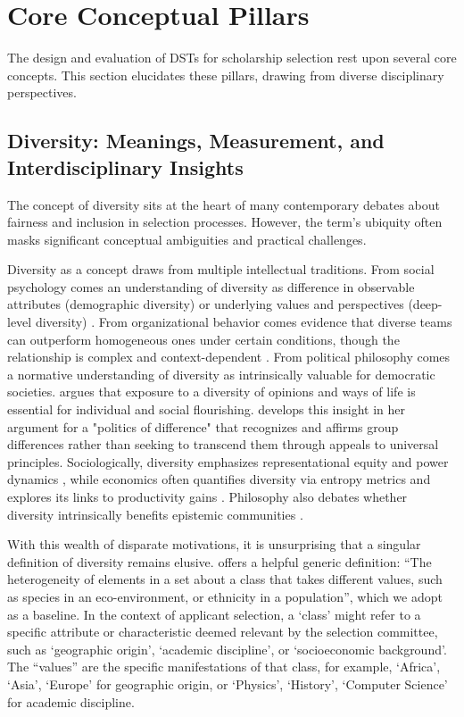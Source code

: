 \section{Core Conceptual Pillars}\label{sec:context_conceptual_pillars}

The design and evaluation of DSTs for scholarship selection rest upon several core concepts. This section elucidates these pillars, drawing from diverse disciplinary perspectives.

\subsection{Diversity: Meanings, Measurement, and Interdisciplinary Insights}\label{ssec:context_diversity}
The concept of diversity sits at the heart of many contemporary debates about fairness and inclusion in selection processes. However, the term's ubiquity often masks significant conceptual ambiguities and practical challenges.

Diversity as a concept draws from multiple intellectual traditions. From social psychology comes an understanding of diversity as difference in observable attributes (demographic diversity) or underlying values and perspectives (deep-level diversity) \cite{harrison1998time}. From organizational behavior comes evidence that diverse teams can outperform homogeneous ones under certain conditions, though the relationship is complex and context-dependent \cite{williams2013demography}. From political philosophy comes a normative understanding of diversity as intrinsically valuable for democratic societies. \textcite{mill1859liberty} argues that exposure to a diversity of opinions and ways of life is essential for individual and social flourishing. \textcite{young1990justice} develops this insight in her argument for a "politics of difference" that recognizes and affirms group differences rather than seeking to transcend them through appeals to universal principles. Sociologically, diversity emphasizes representational equity and power dynamics \cite{benjamin2019race,noble2018algorithms}, while economics often quantifies diversity via entropy metrics and explores its links to productivity gains \cite{noray2023systemic, page_diversity_2010}. Philosophy also debates whether diversity intrinsically benefits epistemic communities \cite{page_diversity_2010}.

With this wealth of disparate motivations, it is unsurprising that a singular definition of diversity remains elusive. \textcite{page_diversity_2010} offers a helpful generic definition: ``The heterogeneity of elements in a set about a class that takes different values, such as species in an eco-environment, or ethnicity in a population'', which we adopt as a baseline. In the context of applicant selection, a `class' might refer to a specific attribute or characteristic deemed relevant by the selection committee, such as `geographic origin', `academic discipline', or `socioeconomic background'. The ``values'' are the specific manifestations of that class, for example, `Africa', `Asia', `Europe' for geographic origin, or `Physics', `History', `Computer Science' for academic discipline.

